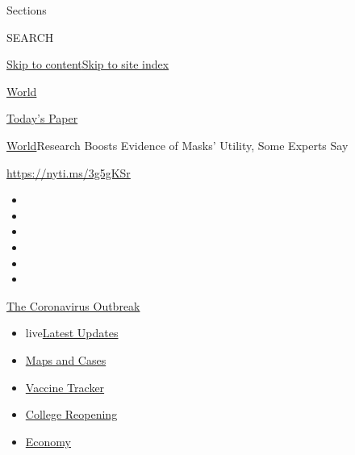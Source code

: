 Sections

SEARCH

\protect\hyperlink{site-content}{Skip to
content}\protect\hyperlink{site-index}{Skip to site index}

\href{https://www.nytimes.com/section/world}{World}

\href{https://myaccount.nytimes.com/auth/login?response_type=cookie\&client_id=vi}{}

\href{https://www.nytimes.com/section/todayspaper}{Today's Paper}

\href{/section/world}{World}\textbar{}Research Boosts Evidence of Masks'
Utility, Some Experts Say

\url{https://nyti.ms/3g5gKSr}

\begin{itemize}
\item
\item
\item
\item
\item
\item
\end{itemize}

\href{https://www.nytimes.com/news-event/coronavirus?action=click\&pgtype=Article\&state=default\&region=TOP_BANNER\&context=storylines_menu}{The
Coronavirus Outbreak}

\begin{itemize}
\tightlist
\item
  live\href{https://www.nytimes.com/2020/08/03/world/coronavirus-covid-19.html?action=click\&pgtype=Article\&state=default\&region=TOP_BANNER\&context=storylines_menu}{Latest
  Updates}
\item
  \href{https://www.nytimes.com/interactive/2020/us/coronavirus-us-cases.html?action=click\&pgtype=Article\&state=default\&region=TOP_BANNER\&context=storylines_menu}{Maps
  and Cases}
\item
  \href{https://www.nytimes.com/interactive/2020/science/coronavirus-vaccine-tracker.html?action=click\&pgtype=Article\&state=default\&region=TOP_BANNER\&context=storylines_menu}{Vaccine
  Tracker}
\item
  \href{https://www.nytimes.com/2020/08/02/us/covid-college-reopening.html?action=click\&pgtype=Article\&state=default\&region=TOP_BANNER\&context=storylines_menu}{College
  Reopening}
\item
  \href{https://www.nytimes.com/live/2020/08/03/business/stock-market-today-coronavirus?action=click\&pgtype=Article\&state=default\&region=TOP_BANNER\&context=storylines_menu}{Economy}
\end{itemize}

